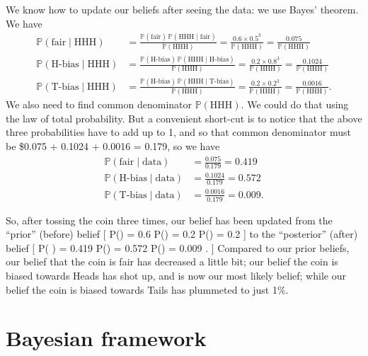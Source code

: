 \documentclass[
  letterpaper,
  DIV=11,
  numbers=noendperiod]{scrreprt}
\theoremstyle{remark}
\begin{document}
We know how to update our beliefs after seeing the data: we use Bayes'
theorem. We have \begin{align*}
\mathbb P(\text{fair} \mid \text{HHH}) &= \frac{\mathbb P(\text{fair})\, \mathbb P(\text{HHH}\mid \text{fair})}{\mathbb P(\text{HHH})} = \frac{0.6 \times 0.5^3}{\mathbb P(\text{HHH})} = \frac{0.075}{\mathbb P(\text{HHH})} \\
\mathbb P(\text{H-bias} \mid \text{HHH}) &= \frac{\mathbb P(\text{H-bias})\, \mathbb P(\text{HHH}\mid \text{H-bias})}{\mathbb P(\text{HHH})} = \frac{0.2 \times 0.8^3}{\mathbb P(\text{HHH})} = \frac{0.1024}{\mathbb P(\text{HHH})} \\
\mathbb P(\text{T-bias} \mid \text{HHH}) &= \frac{\mathbb P(\text{H-bias})\, \mathbb P(\text{HHH}\mid \text{T-bias})}{\mathbb P(\text{HHH})} = \frac{0.2 \times 0.2^3}{\mathbb P(\text{HHH})} = \frac{0.0016}{\mathbb P(\text{HHH})}  .
\end{align*} We also need to find common denominator
\(\mathbb P(\text{HHH})\). We could do that using the law of total
probability. But a convenient short-cut is to notice that the above
three probabilities have to add up to 1, and so that common denominator
must be \$0.075 + 0.1024 + 0.0016 = 0.179, so we have \begin{align*}
  \mathbb P(\text{fair} \mid \text{data}) &= \frac{0.075}{0.179} = 0.419 \\
  \mathbb P(\text{H-bias}\mid \text{data}) &= \frac{0.1024}{0.179} = 0.572 \\
  \mathbb P(\text{T-bias}\mid \text{data}) &= \frac{0.0016}{0.179} = 0.009 .
\end{align*}

So, after tossing the coin three times, our belief has been updated from
the ``prior'' (before) belief {[} \mathbb P() = 0.6
\qquad \mathbb P() = 0.2 \qquad \mathbb P() =
0.2 {]} to the ``posterior'' (after) belief {[} \mathbb P(
\mid {}) = 0.419
\qquad \mathbb P(\mid {}) = 0.572
\qquad \mathbb P(\mid {}) = 0.009 . {]} Compared
to our prior beliefs, our belief that the coin is fair has decreased a
little bit; our belief the coin is biased towards Heads has shot up, and
is now our most likely belief; while our belief the coin is biased
towards Tails has plummeted to just 1\%.

\hypertarget{bayesian-framework}{%
\section{Bayesian framework}\label{bayesian-framework}}
\end{document}
